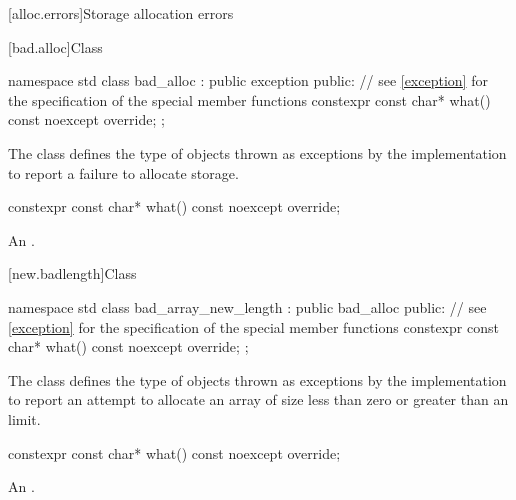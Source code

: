 [alloc.errors]{Storage allocation errors}

[bad.alloc]{Class }%
%

%
\begin{codeblock}
namespace std {
  class bad_alloc : public exception {
  public:
    // see \ref{exception} for the specification of the special member functions
    constexpr const char* what() const noexcept override;
  };
}
\end{codeblock}

\pnum
The class
defines the type of objects thrown as
exceptions by the implementation to report a failure to allocate storage.

%
\begin{itemdecl}
constexpr const char* what() const noexcept override;
\end{itemdecl}

\begin{itemdescr}
\pnum
\returns
An  \ntbs{}.
\end{itemdescr}

[new.badlength]{Class }%
%
%

\begin{codeblock}
namespace std {
  class bad_array_new_length : public bad_alloc {
  public:
    // see \ref{exception} for the specification of the special member functions
    constexpr const char* what() const noexcept override;
  };
}
\end{codeblock}

\pnum
The class  defines the type of objects thrown as
exceptions by the implementation to report an attempt to allocate an array of size
less than zero or
greater than an  limit.

%
\begin{itemdecl}
constexpr const char* what() const noexcept override;
\end{itemdecl}

\begin{itemdescr}
\pnum
\returns
An  \ntbs{}.
\end{itemdescr}

